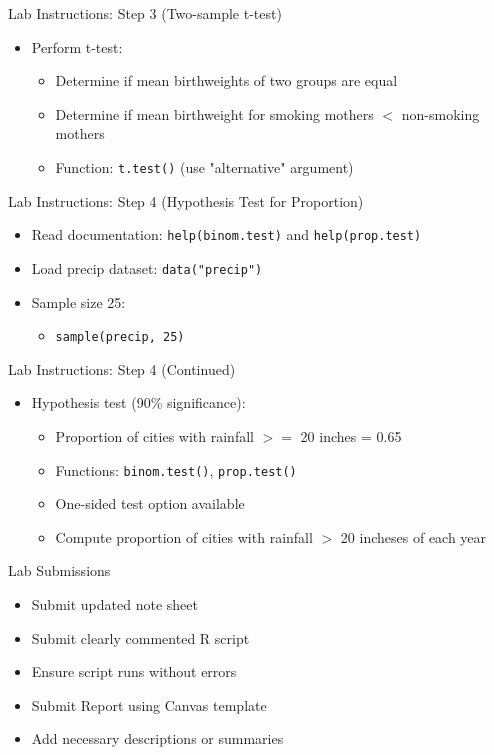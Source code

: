 \documentclass{beamer}
\begin{document}
\begin{frame}{Lab Instructions: Step 3 (Two-sample t-test)}
\begin{itemize}
    \item Perform t-test:
    \begin{itemize}
        \item Determine if mean birthweights of two groups are equal
        \item Determine if mean birthweight for smoking mothers $<$ non-smoking mothers
        \item Function: \texttt{t.test()} (use "alternative" argument)
    \end{itemize}
\end{itemize}
\end{frame}

\begin{frame}{Lab Instructions: Step 4 (Hypothesis Test for Proportion)}
\begin{itemize}
    \item Read documentation: \texttt{help(binom.test)} and \texttt{help(prop.test)}
    \item Load precip dataset: \texttt{data("precip")}
    \item Sample size 25:
    \begin{itemize}
        \item \texttt{sample(precip, 25)}
    \end{itemize}
\end{itemize}
\end{frame}

\begin{frame}{Lab Instructions: Step 4 (Continued)}
\begin{itemize}
    \item Hypothesis test (90\% significance):
    \begin{itemize}
        \item Proportion of cities with rainfall $>=$ 20 inches = 0.65
        \item Functions: \texttt{binom.test()}, \texttt{prop.test()}
        \item One-sided test option available
        \item Compute proportion of cities with rainfall $>$ 20 incheses of each year
    \end{itemize}
\end{itemize}
\end{frame}

\begin{frame}{Lab Submissions}
\begin{itemize}
    \item Submit updated note sheet
    \item Submit clearly commented R script
    \item Ensure script runs without errors
    \item Submit Report using Canvas template
    \item Add necessary descriptions or summaries
\end{itemize}
\end{frame}
\end{document}
